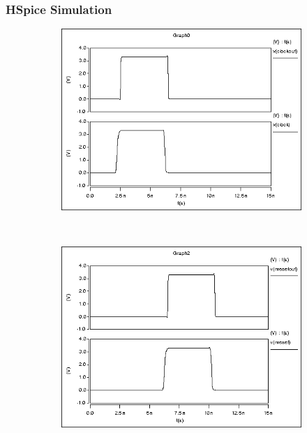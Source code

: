 \subsubsection*{HSpice Simulation}
\begin{figure}[ht!]
        \centering
        \begin{subfigure}[b]{0.45\textwidth}
                \includegraphics[width=\textwidth]{../leftbuf/hspiceClock.png}
        \end{subfigure}%
        ~ %
        \begin{subfigure}[b]{0.45\textwidth}
                \includegraphics[width=\textwidth]{../leftbuf/hspiceNReset.png}

\end{subfigure}
\end{figure}
